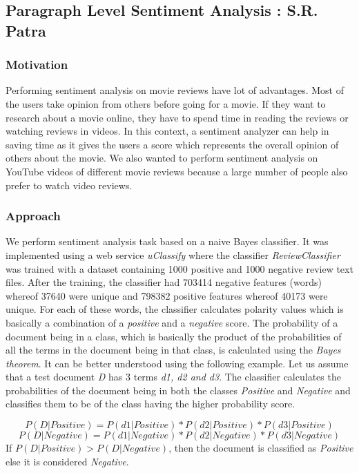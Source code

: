\subsection{Paragraph Level Sentiment Analysis : S.R. Patra}
\subsubsection{Motivation}
Performing sentiment analysis on movie reviews have  lot of advantages. Most of the users take opinion from others before going for a movie. If they want to research about a movie online, they have to spend time in reading the reviews or watching reviews in videos. In this context, a sentiment analyzer can help in saving time as it gives the users a score which represents the overall opinion of others about the movie. We also wanted to perform sentiment analysis on YouTube videos of different movie reviews because a large number of people also prefer to watch video reviews. 

\subsubsection{Approach}

We perform sentiment analysis task based on a naive Bayes classifier. It was implemented using a web service \textit{uClassify}\cite{uclassify} where the classifier \textit{ReviewClassifier} was trained with a dataset containing 1000 positive and 1000 negative review text files\cite{Dataset}. After the training, the classifier had 703414 negative features (words) whereof 37640 were unique and 798382 positive features whereof 40173 were unique. For each of these words, the classifier calculates polarity values which is basically a combination of a \textit{positive} and a \textit{negative} score.  The probability of a document being in a class, which is basically the product of the probabilities of all the terms in the document being in that class, is calculated using the \textit{Bayes theorem}. It can be better understood using the following example. Let us assume that a test document \textit{D} has 3 terms \textit{d1, d2 and d3}. The classifier calculates the probabilities of the document being in both the classes \textit{Positive} and \textit{Negative} and classifies them to be of the class having the higher probability score.

$$ P(D|Positive) = P(d1|Positive) * P(d2|Positive)* P(d3|Positive)$$
$$P(D|Negative) = P(d1|Negative) * P(d2|Negative)* P(d3|Negative)$$
\linebreak
If $P(D|Positive) > P(D|Negative)$, then the document is classified as \textit{Positive} else it is considered \textit{Negative}. 

